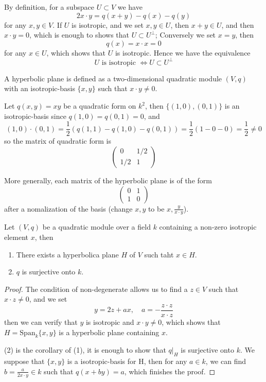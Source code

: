 \begin{remark}
    By definition, for a subspace \(U \subset V\) we have
    \[2 x \cdot y = q(x+y) -q(x) -q(y)\]
    for any \(x, y \in V\). If \(U\) is isotropic, and we set \(x,y \in U\), then \(x +y \in U\), and then \(x \cdot y = 0\), which is enough to shows that \(U \subset U^\perp\); Conversely we set \(x = y\), then
    \[q(x) = x \cdot x = 0\]
    for any \(x \in U\), which shows that \(U\) is isotropic. Hence we have the equivalence
    \[U \text{ is isotropic } \iff U \subset U^\perp\]
\end{remark}


\begin{definition}
    A hyperbolic plane is defined as a two-dimensional quadratic module \((V,q)\) with an isotropic-basis \(\{x,y\}\) such that \(x \cdot y \neq 0\).
\end{definition}

\begin{example}
    Let \(q(x,y) = xy\) be a quadratic form on \(k^2\), then \(\{(1,0),(0,1)\}\) is an isotropic-basis since \(q(1,0) = q(0,1) = 0\), and \[(1,0) \cdot (0,1) = \frac{1}{2}(q(1,1)-q(1,0)-q(0,1)) = \frac{1}{2}(1-0-0) = \frac{1}{2} \neq 0\]
    so the matrix of quadratic form is 
    \[\begin{pmatrix}
        0 & 1/2 \\
        1/2 & 1 
    \end{pmatrix}\]
\end{example}

More generally, each matrix of the hyperbolic plane is of the form 
\[\begin{pmatrix}
    0 & 1 \\
    1 & 0
\end{pmatrix}\]
after a nomalization of the basis (change \(x,y \) to be \(x, \frac{y}{x \cdot y}\)).

\begin{colorproposition} \label{translation}
    Let \((V,q)\) be a quadratic module over a field \(k\) containing a non-zero isotropic element \(x\), then
    \begin{enumerate}
        \item There exists a hyperbolica plane \(H\) of \(V\) such taht \(x \in H\).
        \item \(q\) is surjective onto \(k\).
    \end{enumerate}
\end{colorproposition}

\begin{proof}
    The condition of non-degenerate allows us to find a \(z \in V\) such that \(x \cdot z  \neq 0 \), and we set
    \[y = 2z + ax ,  \quad a = - \frac{z \cdot z}{x \cdot z}\]
    then we can verify that \(y\) is isotropic and \(x \cdot y \neq 0\), which shows that \(H = \mathrm{Span}_k \{x ,y\}\) is a hyperbolic plane containing \(x\). 
    
    (2) is the corollary of (1), it is enough to show that \(q|_H\) is surjective onto \(k\). We suppose that \(\{x,y\}\) is a isotropic-basis for H, then for any \(a \in k\), we can find \(b = \frac{a}{2 x \cdot y} \in k\) such that \(q(x +by)= a\), which finishes the proof.
\end{proof}

